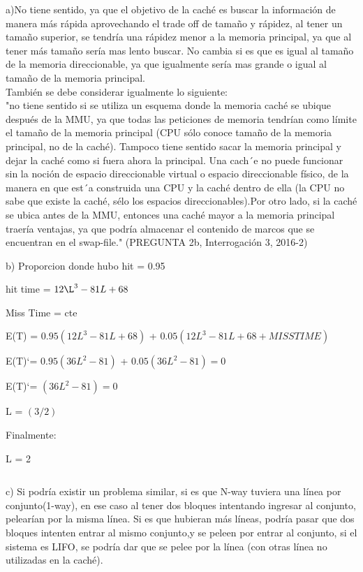 \documentclass[letter]{article}
\begin{document}
	\begin{pregunta}{2}

$$ $$
a)No tiene sentido, ya que el objetivo de la caché es buscar la información de manera más rápida aprovechando el trade off de tamaño y rápidez, al tener un tamaño superior, se tendría una rápidez menor a la memoria principal, ya que al tener más tamaño sería mas lento buscar. No cambia si es que es igual al tamaño de la memoria direccionable, ya que igualmente sería mas grande o igual al tamaño de la memoria principal.
$$ $$
También se debe considerar igualmente lo siguiente:
$$ $$
"no tiene sentido si se utiliza un esquema donde la memoria caché se ubique después de la
MMU, ya que todas las peticiones de memoria tendrían como límite el tamaño de la memoria principal (CPU sólo conoce tamaño de la memoria principal, no de la caché). Tampoco tiene sentido sacar la memoria principal y dejar la caché como si fuera ahora la principal. Una cach´e no puede funcionar sin la noción de espacio direccionable virtual o espacio direccionable físico, de la manera en que est´a construida una CPU y la caché dentro de ella (la CPU no sabe que existe la caché, sélo los espacios direccionables).Por otro lado, si la caché se ubica antes de la MMU, entonces una caché mayor a la memoria principal
traería ventajas, ya que podría almacenar el contenido de marcos que se encuentran en el swap-file." (PREGUNTA 2b, Interrogación 3, 2016-2)


$$ $$
b) Proporcion donde hubo hit = 0.95

hit time = $12\L^3 - 81L + 68$

Miss Time = cte

E(T) = $0.95(12L^3 - 81L +68)$ + $0.05(12L^3 - 81L +68 + MISS TIME)$

E(T)`= $0.95(36L^2 - 81)$ + $0.05(36L^2 - 81) = 0$ 

E(T)`= $(36L^2 - 81) = 0$

L = $(3/2)$

Finalmente:

L = 2

$$ $$

c) Si podría existir un problema similar, si es que N-way tuviera una línea por conjunto(1-way), en ese caso al tener dos bloques intentando ingresar al conjunto, pelearían por la misma línea. Si es que hubieran más líneas, podría pasar que dos bloques intenten entrar al mismo conjunto,y se peleen por entrar al conjunto, si el sistema es LIFO, se podría dar que se pelee por la línea (con otras línea no utilizadas en la caché).



\end{pregunta}
\end{document}
